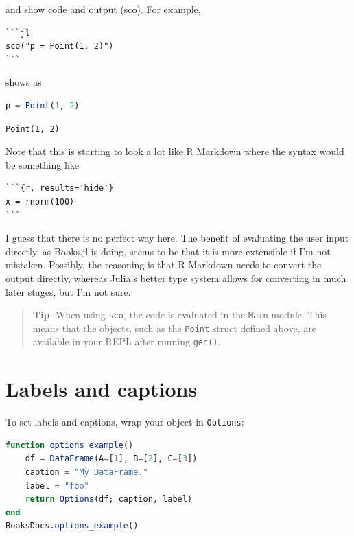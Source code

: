 \documentclass[
  notoc %
]{tufte-book}
\newcommand{\passthrough}[1]{#1}
\begin{document}
and show code and output (sco). For example,

\begin{lstlisting}
```jl
sco("p = Point(1, 2)")
```
\end{lstlisting}

shows as

\begin{lstlisting}[language=Julia]
p = Point(1, 2)
\end{lstlisting}

\begin{lstlisting}[language=Output]
Point(1, 2)
\end{lstlisting}

Note that this is starting to look a lot like R Markdown where the
syntax would be something like

\begin{lstlisting}
```{r, results='hide'}
x = rnorm(100)
```
\end{lstlisting}

I guess that there is no perfect way here. The benefit of evaluating the
user input directly, as Books.jl is doing, seems to be that it is more
extensible if I'm not mistaken. Possibly, the reasoning is that R
Markdown needs to convert the output directly, whereas Julia's better
type system allows for converting in much later stages, but I'm not
sure.

\begin{quote}
\textbf{Tip}: When using \passthrough{\lstinline!sco!}, the code is
evaluated in the \passthrough{\lstinline!Main!} module. This means that
the objects, such as the \passthrough{\lstinline!Point!} struct defined
above, are available in your REPL after running
\passthrough{\lstinline!gen()!}.
\end{quote}

\hypertarget{sec:labels-captions}{%
\section{Labels and captions}\label{sec:labels-captions}}

To set labels and captions, wrap your object in
\passthrough{\lstinline!Options!}:

\begin{lstlisting}[language=Julia]
function options_example()
    df = DataFrame(A=[1], B=[2], C=[3])
    caption = "My DataFrame."
    label = "foo"
    return Options(df; caption, label)
end
BooksDocs.options_example()
\end{lstlisting}
\end{document}
